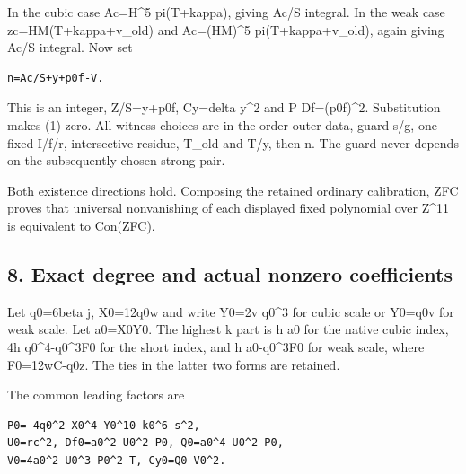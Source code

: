 In the cubic case Ac=\allowbreak{}H\textasciicircum{}\allowbreak{}5 pi(T+\allowbreak{}kappa), giving Ac/\allowbreak{}S integral. In the weak case zc=\allowbreak{}HM(T+\allowbreak{}kappa+\allowbreak{}v\_\allowbreak{}old) and Ac=\allowbreak{}(HM)\textasciicircum{}\allowbreak{}5 pi(T+\allowbreak{}kappa+\allowbreak{}v\_\allowbreak{}old), again giving Ac/\allowbreak{}S integral. Now set



\begin{verbatim}
n=Ac/S+y+p0f-V.
\end{verbatim}

This is an integer, Z/\allowbreak{}S=\allowbreak{}y+\allowbreak{}p0f, Cy=\allowbreak{}delta y\textasciicircum{}\allowbreak{}2 and P Df=\allowbreak{}(p0f)\textasciicircum{}\allowbreak{}2. Substitution makes (1) zero. All witness choices are in the order outer data, guard s/\allowbreak{}g, one fixed I/\allowbreak{}f/\allowbreak{}r, intersective residue, T\_\allowbreak{}old and T/\allowbreak{}y, then n. The guard never depends on the subsequently chosen strong pair.



Both existence directions hold. Composing the retained ordinary calibration, ZFC proves that universal nonvanishing of each displayed fixed polynomial over Z\textasciicircum{}\allowbreak{}11 is equivalent to Con(ZFC).



\subsection{8. Exact degree and actual nonzero coefficients}



Let q0=\allowbreak{}6beta j, X0=\allowbreak{}12q0w and write Y0=\allowbreak{}2v q0\textasciicircum{}\allowbreak{}3 for cubic scale or Y0=\allowbreak{}q0v for weak scale. Let a0=\allowbreak{}X0Y0. The highest k part is h a0 for the native cubic index, 4h q0\textasciicircum{}\allowbreak{}4-q0\textasciicircum{}\allowbreak{}3F0 for the short index, and h a0-q0\textasciicircum{}\allowbreak{}3F0 for weak scale, where F0=\allowbreak{}12wC-q0z. The ties in the latter two forms are retained.



The common leading factors are



\begin{verbatim}
P0=-4q0^2 X0^4 Y0^10 k0^6 s^2,
U0=rc^2, Df0=a0^2 U0^2 P0, Q0=a0^4 U0^2 P0,
V0=4a0^2 U0^3 P0^2 T, Cy0=Q0 V0^2.
\end{verbatim}

